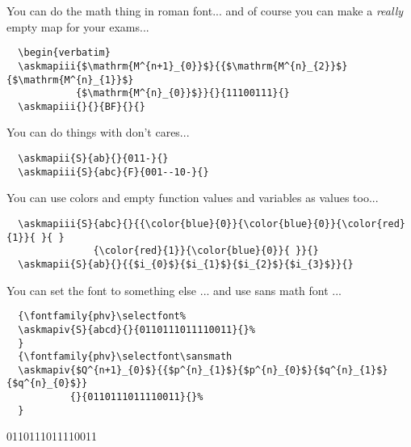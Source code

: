 \documentclass[a4paper,10pt]{ltxdoc}
\begin{document}
You can do the math thing in roman font... and of course you can make a
\textsl{really} empty map for your exams...
\begin{verbatim}
  \begin{verbatim}
  \askmapiii{$\mathrm{M^{n+1}_{0}}$}{{$\mathrm{M^{n}_{2}}$}{$\mathrm{M^{n}_{1}}$}
            {$\mathrm{M^{n}_{0}}$}}{}{11100111}{}
  \askmapiii{}{}{BF}{}{}
\end{verbatim}
\bigskip\bigskip

You can do things with don't cares...
\begin{verbatim}
  \askmapii{S}{ab}{}{011-}{}
  \askmapiii{S}{abc}{F}{001--10-}{}
\end{verbatim}
\bigskip\bigskip

You can use colors and empty function values and variables as values too...
\begin{verbatim}
  \askmapiii{S}{abc}{}{{\color{blue}{0}}{\color{blue}{0}}{\color{red}{1}}{ }{ }
               {\color{red}{1}}{\color{blue}{0}}{ }}{}
  \askmapii{S}{ab}{}{{$i_{0}$}{$i_{1}$}{$i_{2}$}{$i_{3}$}}{}
\end{verbatim}
\bigskip

\newpage
You can set the font to something else ... and use sans math font ...
\begin{verbatim}
  {\fontfamily{phv}\selectfont%
  \askmapiv{S}{abcd}{}{0110111011110011}{}%
  }
  {\fontfamily{phv}\selectfont\sansmath
  \askmapiv{$Q^{n+1}_{0}$}{{$p^{n}_{1}$}{$p^{n}_{0}$}{$q^{n}_{1}$}{$q^{n}_{0}$}}
           {}{0110111011110011}{}%
  }
\end{verbatim}
{\selectfont%
%
}
{\selectfont\sansmath
{}
         {}{0110111011110011}{}%
}
\bigskip\bigskip
\end{document}
